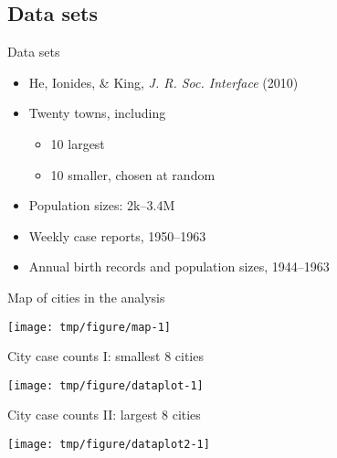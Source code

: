 \subsection{Data sets}

\begin{frame}[allowframebreaks]{Data sets}
  \begin{itemize}
  \item He, Ionides, \& King, \emph{J. R. Soc. Interface} (2010)
  \item Twenty towns, including
    \begin{itemize}
    \item 10 largest
    \item 10 smaller, chosen at random
    \end{itemize}
  \item Population sizes: 2k--3.4M
  \item Weekly case reports, 1950--1963
  \item Annual birth records and population sizes, 1944--1963
  \end{itemize}
\end{frame}

\begin{frame}{Map of cities in the analysis}
\begin{knitrout}\small
{}\color{fgcolor}

{\centering \texttt{[image: tmp/figure/map-1]} 

}


\end{knitrout}
\end{frame}

\begin{frame}{City case counts I: smallest 8 cities}
\begin{knitrout}\small
{}\color{fgcolor}

{\centering \texttt{[image: tmp/figure/dataplot-1]} 

}


\end{knitrout}
\end{frame}

\begin{frame}{City case counts II: largest 8 cities}
\begin{knitrout}\small
{}\color{fgcolor}

{\centering \texttt{[image: tmp/figure/dataplot2-1]} 

}


\end{knitrout}
\end{frame}

